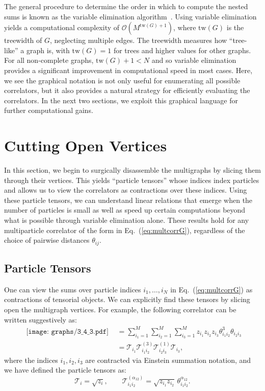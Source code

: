 \documentclass[aps,prd,floatfix,preprintnumbers,twocolumn,groupedaddress,nofootinbib,longbibliography,10pt]{revtex4-1}
\DeclareRobustCommand{\Eq}[1]{Eq.~(\ref{#1})}
\DeclareRobustCommand{\asymwedgeA}[1]{\begin{gathered}\texttt{[image: graphs/3\_4\_3.pdf]}\end{gathered}}
\begin{document}
The general procedure to determine the order in which to compute the nested sums is known as the variable elimination algorithm~\cite{zhang1996exploiting}.
%
Using variable elimination yields a computational complexity of $\mathcal O(M^{\text{tw}(G)+1})$, where $\text{tw}(G)$ is the treewidth of $G$, neglecting multiple edges.
%
The treewidth measures how ``tree-like'' a graph is, with $\text{tw}(G)=1$ for trees and higher values for other graphs.
%
For all non-complete graphs, $\text{tw}(G)+1 < N$ and so variable elimination provides a significant improvement in computational speed in most cases.
%
Here, we see the graphical notation is not only useful for enumerating all possible correlators, but it also provides a natural strategy for efficiently evaluating the correlators.
%
In the next two sections, we exploit this graphical language for further computational gains.



\section{Cutting Open Vertices}
\label{sec:verts}


In this section, we begin to surgically disassemble the multigraphs by slicing them through their vertices.
%
This yields ``particle tensors'' whose indices index particles and allows us to view the correlators as contractions over these indices.
%
Using these particle tensors, we can understand linear relations that emerge when the number of particles is small as well as speed up certain computations beyond what is possible through variable elimination alone.
%
These results hold for any multiparticle correlator of the form in \Eq{eq:multcorrG}, regardless of the choice of pairwise distances $\theta_{ij}$.


\subsection{Particle Tensors}


One can view the sums over particle indices $i_1,\ldots,i_N$ in \Eq{eq:multcorrG} as contractions of tensorial objects.
%
We can explicitly find these tensors by slicing open the multigraph vertices.
%
For example, the following correlator can be written suggestively as:
\begin{align}
\asymwedgeA{0.16} &= \sum_{i_1=1}^M \sum_{i_2=1}^M\sum_{i_3=1}^M z_{i_1}z_{i_2}z_{i_3} \theta_{i_1i_2}^3 \theta_{i_2 i_3} \nonumber \\
&= \mathcal{T}_{i_1} \mathcal{T}^{(3)}_{i_1i_2} \mathcal{T}^{(1)}_{i_2 i_3} \mathcal{T}_{i_3},
\label{eq:cutvertex}
\end{align}
%
where the indices $i_1,i_2,i_3$ are contracted via Einstein summation notation, and we have defined the particle tensors as:
%
\begin{equation}
\mathcal{T}_{i} = \sqrt{z_i}, \qquad \mathcal{T}^{(\alpha_{12})}_{i_1 i_2} = \sqrt{z_{i_1}z_{i_2}} \, \theta^{\alpha_{12}}_{i_1 i_2}.
\end{equation}
\end{document}
